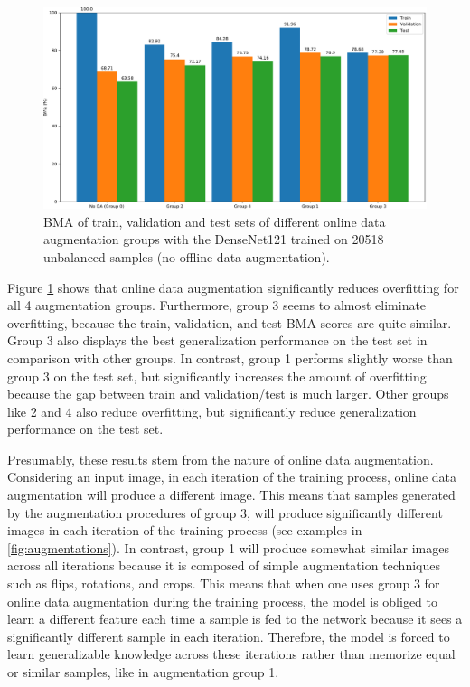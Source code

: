     \begin{figure}[ht]
        \centering
        \includegraphics[width=\textwidth]{figs/data_aug_online_group_comp.pdf}
        \caption{\ac{BMA} of train, validation and test sets of different online data augmentation groups with the DenseNet121 trained on 20518 unbalanced samples (no offline data augmentation).}
        \label{fig:data_aug_online_group_comp}
    \end{figure}
    
    Figure \ref{fig:data_aug_online_group_comp} shows that online data augmentation significantly reduces overfitting for all 4 augmentation groups. Furthermore, group 3 seems to almost eliminate overfitting, because the train, validation, and test \ac{BMA} scores are quite similar. Group 3 also displays the best generalization performance on the test set in comparison with other groups. In contrast, group 1 performs slightly worse than group 3 on the test set, but significantly increases the amount of overfitting because the gap between train and validation/test is much larger. Other groups like 2 and 4 also reduce overfitting, but significantly reduce generalization performance on the test set. \par

    Presumably, these results stem from the nature of online data augmentation. Considering an input image, in each iteration of the training process, online data augmentation will produce a different image. This means that samples generated by the augmentation procedures of group 3, will produce significantly different images in each iteration of the training process (see examples in \autoref{fig:augmentations}). In contrast, group 1 will produce somewhat similar images across all iterations because it is composed of simple augmentation techniques such as flips, rotations, and crops. This means that when one uses group 3 for online data augmentation during the training process, the model is obliged to learn a different feature each time a sample is fed to the network because it sees a significantly different sample in each iteration. Therefore, the model is forced to learn generalizable knowledge across these iterations rather than memorize equal or similar samples, like in augmentation group 1. \par
    
